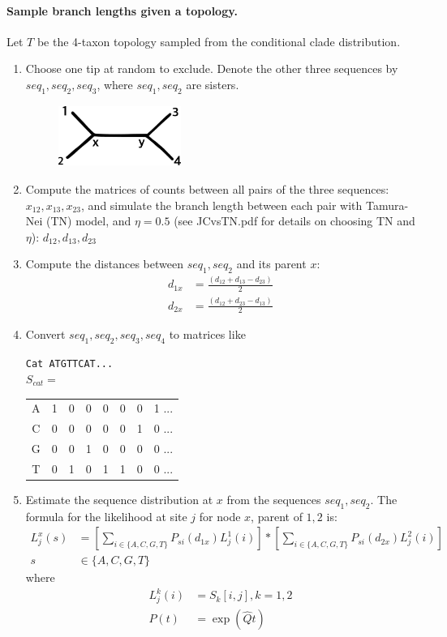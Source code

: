 \documentclass[12pt,letterpaper]{article}
\begin{document}
\paragraph{Sample branch lengths given a topology.} Let $T$ be the 4-taxon
topology sampled from the conditional clade distribution.
\begin{enumerate}
\item Choose one tip at random to exclude. Denote the other three sequences by
  $seq_1,seq_2,seq_3$, where $seq_1,seq_2$ are sisters.

\begin{figure}[ht]
\centering
\includegraphics[width=4cm,height=2cm]{quartet12x34y.eps}
\end{figure}

\item Compute the matrices of counts between all pairs of the three
  sequences: $x_{12}, x_{13}, x_{23}$, and simulate the branch length between
  each pair with Tamura-Nei (TN) model, and $\eta=0.5$ (see JCvsTN.pdf for
  details on choosing TN and $\eta$): $d_{12},d_{13},d_{23}$
\item Compute the distances between $seq_1,seq_2$ and its parent $x$:
\begin{align*}
  d_{1x} &= \frac{(d_{12}+d_{13}-d_{23})}{2} \\
  d_{2x} &= \frac{(d_{12}+d_{23}-d_{13})}{2}
\end{align*}
\item Convert $seq_1,seq_2,seq_3,seq_4$ to matrices like
\begin{center}
\texttt{Cat ATGTTCAT...}\\[0.5cm]
$S_{cat}=$
\begin{tabular}{cccccccc}
A & 1 & 0 & 0 & 0 & 0 & 0 & 1 ...\\
C & 0 & 0 & 0 & 0 & 0 & 1 & 0 ...\\
G & 0 & 0 & 1 & 0 & 0 & 0 & 0 ...\\
T & 0 & 1 & 0 & 1 & 1 & 0 & 0 ...
\end{tabular}
\end{center}
\item Estimate the sequence distribution at $x$ from the sequences
  $seq_1,seq_2$. The formula for the likelihood at site $j$ for node
  $x$, parent of $1,2$ is:
\begin{align*}
L^x_j(s) &= \left[ \sum_{i \in \{A,C,G,T\}} P_{si}(d_{1x}) L^1_j(i)
\right] * \left[ \sum_{i \in \{A,C,G,T\}} P_{si}(d_{2x}) L^2_j(i)
\right] \\
s &\in \{A,C,G,T\}
\end{align*}
where
\begin{align*}
L^k_j(i) &= S_k[i,j], k=1,2 \\
P(t) &= \exp(\hat{Q}t)
\end{align*}


\end{enumerate}
\end{document}
